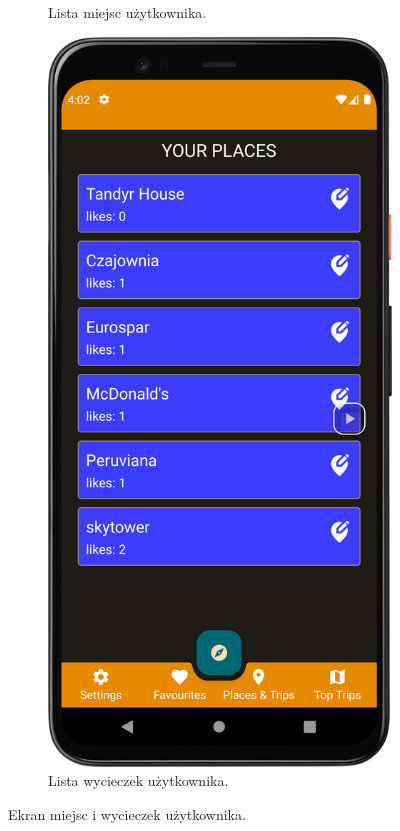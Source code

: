 \begin{figure}[H]
\begin{subfigure}[b]{0.28\textwidth}
                \caption{Lista miejsc użytkownika.\label{user_places}}
            \end{subfigure}
            \hfill
            \begin{subfigure}[b]{0.28\textwidth}
                \centering
                \includegraphics[width=\textwidth]{src/app/user_places.png}
                \caption{Lista wycieczek użytkownika.\label{user_trips}}
            \end{subfigure}
            \caption{Ekran miejsc i wycieczek użytkownika.\label{user_stuff}}
            \qquad
        \end{figure} 

